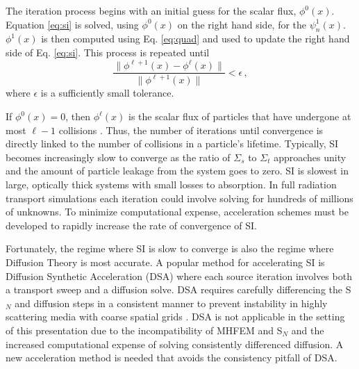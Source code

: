 \documentclass{anstrans}
\newcommand{\SN}{S$_N$\xspace}
\begin{document}
	The iteration process begins with an initial guess for the scalar flux, $\phi^0(x)$. Equation \ref{eq:si} is solved, using $\phi^0(x)$ on the right hand side, for the $\psi_n^1(x)$. $\phi^1(x)$ is then computed using Eq. \ref{eq:quad} and used to update the right hand side of Eq. \ref{eq:si}. 
	This process is repeated until 
		\begin{equation} \label{eq:converg}
			\frac{\|\phi^{\ell+1}(x) - \phi^{\ell}(x)\|}{\|\phi^{\ell+1}(x)\|} < \epsilon \,,
		\end{equation}
	where $\epsilon$ is a sufficiently small tolerance. 

	If $\phi^0(x) = 0$, then $\phi^\ell(x)$ is the scalar flux of particles that have undergone at most $\ell - 1$ collisions \cite{adams}. Thus, the number of iterations until convergence is directly linked to the number of collisions in a particle's lifetime. Typically, SI becomes increasingly slow to converge as the ratio of $\Sigma_s$ to $\Sigma_t$ approaches unity and the amount of particle leakage from the system goes to zero. SI is slowest in large, optically thick systems with small losses to absorption. In full radiation transport simulations each iteration could involve solving for hundreds of millions of unknowns. To minimize computational expense, acceleration schemes must be developed to rapidly increase the rate of convergence of SI. 

	Fortunately, the regime where SI is slow to converge is also the regime where Diffusion Theory is most accurate. A popular method for accelerating SI is Diffusion Synthetic Acceleration (DSA) where each source iteration involves both a transport sweep and a diffusion solve. DSA requires carefully differencing the \SN and diffusion steps in a consistent manner to prevent instability in highly scattering media with coarse spatial grids \cite{alcouffe,morel}. DSA is not applicable in the setting of this presentation due to the incompatibility of MHFEM and \SN and the increased computational expense of solving consistently differenced diffusion. A new acceleration method is needed that avoids the consistency pitfall of DSA. 
\end{document}
